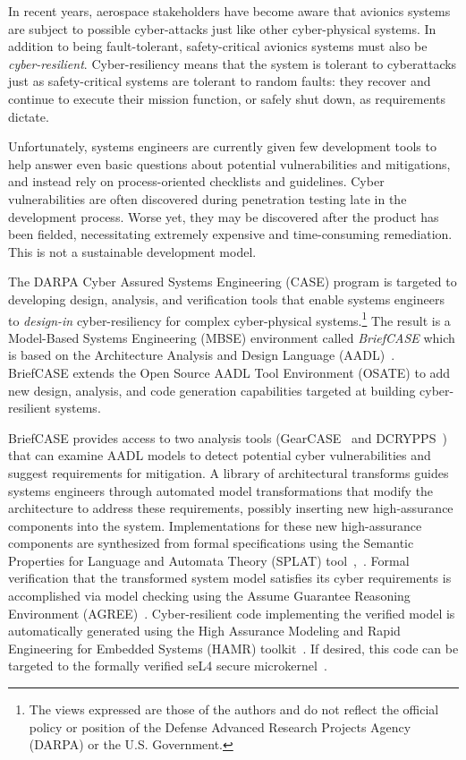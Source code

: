 In recent years, aerospace stakeholders have become aware that avionics systems are subject to possible cyber-attacks just like other cyber-physical systems.  In addition to being fault-tolerant, safety-critical avionics systems must also be {\em cyber-resilient}. Cyber-resiliency means that the system is tolerant to cyberattacks just as safety-critical systems are tolerant to random faults: they recover and continue to execute their mission function, or safely shut down, as requirements dictate. 

Unfortunately, systems engineers are currently given few development tools to help answer even basic questions about potential vulnerabilities and mitigations, and instead rely on process-oriented checklists and guidelines.  Cyber vulnerabilities are often discovered during penetration testing late in the development process.  Worse yet, they may be discovered after the product has been fielded, necessitating extremely expensive and time-consuming remediation. This is not a sustainable development model.

The DARPA Cyber Assured Systems Engineering (CASE) program is targeted to developing design, analysis, and verification tools that enable systems engineers to {\em design-in} cyber-resiliency for complex cyber-physical systems.\footnote{The
  views expressed are those of the authors and do not reflect the
  official policy or position of the Defense Advanced
  Research Projects Agency (DARPA) or the U.S. Government.}
The result is a Model-Based Systems Engineering (MBSE) environment called {\em BriefCASE} which is based on the Architecture Analysis and Design Language (AADL)~\cite{aadl}.  BriefCASE extends the Open Source AADL Tool Environment (OSATE) to add new design, analysis, and code generation capabilities targeted at building cyber-resilient systems.  

BriefCASE provides access to two analysis tools (GearCASE~\cite{gearcase2020} and DCRYPPS~\cite{dcrypps2019}) that can examine AADL models to detect potential cyber vulnerabilities and suggest requirements for mitigation.  
A library of architectural transforms guides systems engineers through automated model transformations that modify the architecture to address these requirements, possibly inserting new high-assurance components into the system. 
Implementations for these new high-assurance components are synthesized from formal specifications using the Semantic Properties for Language and Automata Theory (SPLAT) tool~\cite{slind-hcss2020},~\cite{formal-filter-synth-langsec}.
Formal verification that the transformed system model satisfies its cyber requirements is accomplished via model checking using the Assume Guarantee Reasoning Environment (AGREE)~\cite{agree2013}.  Cyber-resilient code implementing the verified model is automatically generated using the High Assurance Modeling and Rapid Engineering for Embedded Systems (HAMR) toolkit~\cite{hamr}.  If desired, this code can be targeted to the formally verified seL4 secure microkernel~\cite{sel4-2009}.

